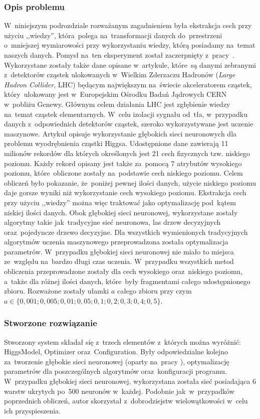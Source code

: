 \subsubsection{Opis problemu}
W~niniejszym podrozdziale rozważanym zagadnieniem była ekstrakcja cech przy użyciu ,,wiedzy'', która~polega na~transformacji danych do~przestrzeni o~mniejszej wymiarowości przy wykorzystaniu wiedzy, którą posiadamy na~temat naszych danych. Pomysł na~ten eksperyment został zaczerpnięty z~pracy~\cite{higgs1}. Wykorzystane zostały także dane opisane w~artykule, które~są danymi zebranymi z~detektorów cząstek ulokowanych w~Wielkim Zderzaczu Hadronów (\textit{Large Hadron Collider}, LHC) będącym największym na~świecie akceleratorem cząstek, który~ulokowany jest w~Europejskim Ośrodku Badań Jądrowych CERN w~pobliżu Genewy. Głównym celem działania LHC jest zgłębienie wiedzy na~temat cząstek elementarnych. W~celu izolacji sygnału od~tła, w~przypadku danych z~odpowiednich detektorów cząstek, szeroko wykorzystywane jest uczenie maszynowe. Artykuł opisuje wykorzystanie głębokich sieci neuronowych dla problemu wyodrębnienia cząstki Higgsa. Udostępnione dane zawierają 11 milionów rekordów dla których określonych jest 21 cech fizycznych tzw. niskiego poziomu. Każdy rekord opisany jest także za~pomocą 7 atrybutów wysokiego poziomu, które~obliczone zostały na~podstawie cech niskiego poziomu. Celem obliczeń było pokazanie, że~poniżej pewnej ilości danych, użycie niskiego poziomu daje gorsze wyniki niż wykorzystanie cech wysokiego poziomu. Ekstrakcja cech przy użyciu ,,wiedzy'' można więc traktować jako optymalizację pod~kątem niskiej ilości danych. Obok głębokiej sieci neuronowej, wykorzystane zostały algorytmy takie jak~tradycyjne sieć neuronowa, las drzew decyzyjnych oraz~pojedyncze drzewo decyzyjne. Dla wszystkich wymienionych tradycyjnych algorytmów uczenia maszynowego przeprowadzona została optymalizacja parametrów. W~przypadku głębokiej sieci neuronowej nie miało to miejsca ze~względu na~bardzo długi czas uczenia. W~przypadku wszystkich metod obliczenia przeprowadzone zostały dla cech wysokiego oraz~niskiego poziomu, a~także dla różnej ilości danych, które~były fragmentami całego udostępnionego zbioru. Rozważone zostały ułamki $a$ całego zbioru przy czym $a\in\{0,001; 0,005; 0,01; 0,05; 0,1; 0,2; 0,3; 0,4; 0,5\}$. 

\subsubsection{Stworzone rozwiązanie}
Stworzony system składał się z~trzech elementów z~których można wyróżnić: HiggsModel, Optimizer oraz~Configuration. Były odpowiedzialne kolejno za~tworzenie głębokie sieci neuronowej (oparty na~pracy \cite{higgs2}), optymalizację parametrów dla poszczególnych algorytmów oraz~konfiguracji programu. W~przypadku głębokiej sieci neuronowej, wykorzystana została sieć posiadająca 6 warstw ukrytych po~500 neuronów w~każdej. Podobnie jak~w~przypadków poprzednich obliczeń, autor skorzystał z~dobrodziejstw wielowątkowości w~celu ich przyspieszenia.


